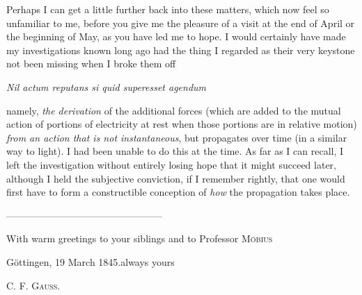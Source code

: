 Perhaps I can get a little further back into these matters, which now feel so unfamiliar to me, before you give me the pleasure of a visit at the end of April or the beginning of May, as you have led me to hope. I would certainly have made my investigations known long ago had the thing I regarded as their very keystone not been missing when I broke them off
\begin{center}\textit{Nil actum reputans si quid superesset agendum}\end{center}
namely, \textit{the derivation} of the additional forces (which are added to the mutual action of portions of electricity at rest when those portions are in relative motion) \textit{from an action that is not instantaneous}, but propagates over time (in a similar way to light). I had been unable to do this at the time. As far as I can recall, I left the investigation without entirely losing hope that it might succeed later, although I held the subjective conviction, if I remember rightly, that one would first have to form a constructible conception of \textit{how} the propagation takes place.
\begin{center}—\quad —\quad —\quad —\quad —\quad —\quad —\quad —\quad —\quad —\quad —\quad —\quad —\quad —\quad —\quad —\end{center}
\noindent\begin{minipage}{\linewidth}
With warm greetings to your siblings and to Professor \textsc{Möbius}

Göttingen, 19 March 1845.\hfill always yours
\begin{flushright}C. F. \textsc{Gauss}.\end{flushright}
\end{minipage}


